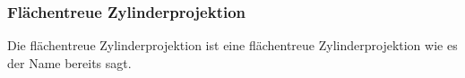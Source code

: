 \subsubsection{Flächentreue Zylinderprojektion}
\label{sec:equareazyl}
Die flächentreue Zylinderprojektion ist eine flächentreue Zylinderprojektion wie es der Name bereits sagt. 